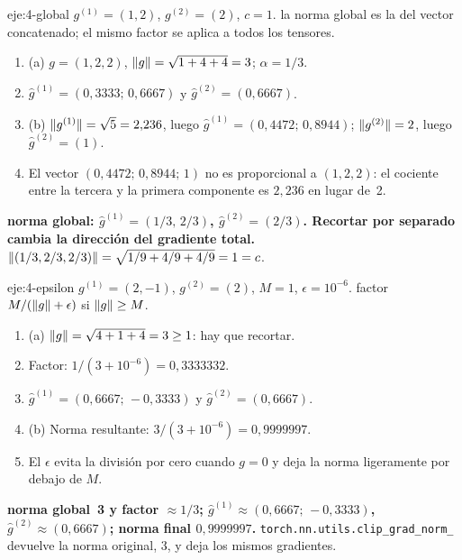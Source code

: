 \begin{solucion}{eje:4-global}
\datos $g^{(1)}=(1,2)$, $g^{(2)}=(2)$, $c=1$.
\planteamiento la norma global es la del vector concatenado; el mismo factor se aplica a todos los tensores.
\pasos
\begin{enumerate}[label=\arabic*.]
  \item (a) $g=(1,2,2)$, $\lVert g\rVert=\sqrt{1+4+4}=3$; $\alpha=1/3$.
  \item $\hat g^{(1)}=(0{,}3333;\,0{,}6667)$ y $\hat g^{(2)}=(0{,}6667)$.
  \item (b) $\lVert g^{(1)}\rVert=\sqrt5=2{,}236$, luego $\hat g^{(1)}=(0{,}4472;\,0{,}8944)$; $\lVert g^{(2)}\rVert=2$, luego $\hat g^{(2)}=(1)$.
  \item El vector $(0{,}4472;\,0{,}8944;\,1)$ no es proporcional a $(1,2,2)$: el cociente entre la tercera y la primera componente es $2{,}236$ en lugar de~2.
\end{enumerate}
\resultado \textbf{norma global: $\hat g^{(1)}=(1/3,\,2/3)$, $\hat g^{(2)}=(2/3)$. Recortar por separado cambia la dirección del gradiente total.}
\comprobacion $\lVert(1/3,2/3,2/3)\rVert=\sqrt{1/9+4/9+4/9}=1=c$.
\end{solucion}

\begin{solucion}{eje:4-epsilon}
\datos $g^{(1)}=(2,-1)$, $g^{(2)}=(2)$, $M=1$, $\epsilon=10^{-6}$.
\planteamiento factor $M/(\lVert g\rVert+\epsilon)$ si $\lVert g\rVert\ge M$.
\pasos
\begin{enumerate}[label=\arabic*.]
  \item (a) $\lVert g\rVert=\sqrt{4+1+4}=3\ge 1$: hay que recortar.
  \item Factor: $1/(3+10^{-6})=0{,}3333332$.
  \item $\hat g^{(1)}=(0{,}6667;\,-0{,}3333)$ y $\hat g^{(2)}=(0{,}6667)$.
  \item (b) Norma resultante: $3/(3+10^{-6})=0{,}9999997$.
  \item El $\epsilon$ evita la división por cero cuando $g=0$ y deja la norma ligeramente por debajo de $M$.
\end{enumerate}
\resultado \textbf{norma global~3 y factor $\approx 1/3$; $\hat g^{(1)}\approx(0{,}6667;\,-0{,}3333)$, $\hat g^{(2)}\approx(0{,}6667)$; norma final $0{,}9999997$.}
\comprobacion \texttt{torch.nn.utils.clip\_grad\_norm\_} devuelve la norma original, 3, y deja los mismos gradientes.
\end{solucion}

